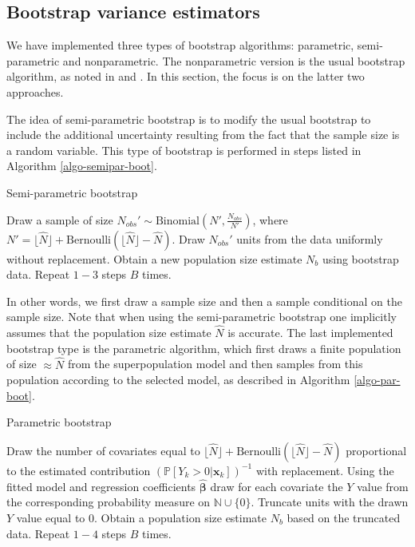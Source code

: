 \documentclass[nojss]{jss}
\newcommand{\1}{\mathcal{I}} \newcommand{\bZero}{\boldsymbol{0}}
\begin{document}
\subsection{Bootstrap variance estimators}\label{sec-boostrap}

We have implemented three types of bootstrap algorithms: parametric,
semi-parametric and nonparametric. The nonparametric version is the
usual bootstrap algorithm, as noted in \cite{norrpoll} and \cite{zwane}.
In this section, the focus is on the latter two approaches.

The idea of semi-parametric bootstrap is to modify the usual bootstrap
to include the additional uncertainty resulting from the fact that the
sample size is a random variable. This type of bootstrap is performed in
steps listed in Algorithm \ref{algo-semipar-boot}.

\begin{algorithm}[ht!]
\small
\caption{Semi-parametric bootstrap}
\label{algo-semipar-boot}\DontPrintSemicolon
{} Draw a sample of size $N_{obs}'\sim\text{Binomial}\left(N', \frac{N_{obs}}{N'}\right)$, where $N'=\lfloor\hat{N}\rfloor+\text{Bernoulli}\left(\lfloor\hat{N}\rfloor-\hat{N}\right)$.\;
 Draw $N_{obs}'$ units from the data uniformly without replacement.\;
 Obtain a new population size estimate $N_b$ using bootstrap data.\;
 Repeat $1-3$ steps $B$ times.
\end{algorithm}

In other words, we first draw a sample size and then a sample
conditional on the sample size. Note that when using the semi-parametric
bootstrap one implicitly assumes that the population size estimate
\(\hat{N}\) is accurate. The last implemented bootstrap type is the
parametric algorithm, which first draws a finite population of size
\(\approx\hat{N}\) from the superpopulation model and then samples from
this population according to the selected model, as described in
Algorithm \ref{algo-par-boot}.

\begin{algorithm}[ht!]
\small
\caption{Parametric bootstrap}
\label{algo-par-boot}\DontPrintSemicolon
{} Draw the number of covariates equal to $\lfloor\hat{N}\rfloor+\text{Bernoulli}\left(\lfloor\hat{N}\rfloor-\hat{N}\right)$ proportional to the estimated contribution $(\mathbb{P}\left[Y_{k}>0|\boldsymbol{x}_{k}\right])^{-1}$ with replacement.\;
 Using the fitted model and regression coefficients $\hat{\boldsymbol{\beta}}$ draw for each covariate the $Y$ value from the corresponding probability measure on $\mathbb{N}\cup\{0\}$.\;
 Truncate units with the drawn $Y$ value equal to $0$.\;
 Obtain a population size estimate $N_b$ based on the truncated data.\;
 Repeat $1-4$ steps $B$ times.
\end{algorithm}
\end{document}
